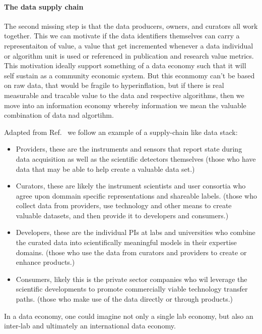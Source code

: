 \documentclass{article}
\begin{document}
\paragraph{The data supply chain}
The second missing step is that the data producers, owners, and curators all work together.  This we can motivate if the data identifiers themselves can carry a representaiton of value, a value that get incremented whenever a data individual or algorithm unit is used or referenced in publication and research value metrics.
This motivation ideally support something of a data economy such that it will self sustain as a community economic system.  But this econmomy can't be based on raw data, that would be fragile to hyperinflation, but if there is real measurable and tracable value to the data and respective algorithms, then we move into an information economy whereby information we mean the valuable combination of data nad algortihm.

Adapted from Ref.~\cite{Elbaz2012} we follow an example of a supply-chain like data stack: %
\begin{itemize}
\item Providers, these are the instruments and sensors that report state during data acquisition as well as the scientific detectors themselves (those who have data that may be able to help create a valuable data set.)
\item Curators, these are likely the instrument scientists and user consortia who agree upon dommain specific representations and shareable labels. (those who collect data from providers, use technology and other means to create valuable datasets, and then provide it to developers and consumers.)
\item Developers, these are the individual PIs at labs and universities who combine the curated data into scientifically meaningful models in their expertise domains. (those who use the data from curators and providers to create or enhance products.)
\item Consumers, likely this is the private sector companies who wil leverage the scientific developments to promote commercially viable technology transfer paths. (those who make use of the data directly or through products.)
\end{itemize}


In a data economy, one could imagine not only a single lab economy, but also an inter-lab and ultimately an international data economy.
\end{document}
